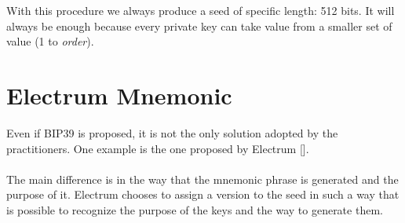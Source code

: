 \begin{remark}
	With this procedure we always produce a seed of specific length: 512 bits. It will always be enough because every private key can take value from a smaller set of value (1 to \textit{order}).
\end{remark}

\section{Electrum Mnemonic}
Even if BIP39 is proposed, it is not the only solution adopted by the practitioners. One example is the one proposed by Electrum [\cite{3}].
\\ \\
The main difference is in the way that the mnemonic phrase is generated and the purpose of it. Electrum chooses to assign a version to the seed in such a way that is possible to recognize the purpose of the keys and the way to generate them.

